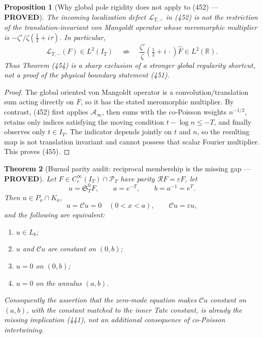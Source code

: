 \documentclass[11pt]{article}
\newtheorem{theorem}{Theorem}
\newtheorem{proposition}[theorem]{Proposition}
\newcommand{\PROVED}{\textcolor{green!45!black}{\textbf{PROVED}}}
\begin{document}
\begin{proposition}[Why global pole rigidity does not apply to (452) ---
\PROVED]
The incoming localization defect \(\mathcal L_{T,-}\) in (452) is not the
restriction of the translation-invariant von Mangoldt operator whose
meromorphic multiplier is
\(-\zeta'/\zeta(\frac12+i\tau)\).  In particular,
\[
 \mathcal L_{T,-}(F)\in L^2(I_T)
 \quad\not\Longleftrightarrow\quad
 \frac{\zeta'}{\zeta}(\tfrac12+i\,\cdot)\widehat F
 \in L^2(\mathbb R).                                 \tag{455}
\]
Thus Theorem (454) is a sharp exclusion of a stronger global regularity
shortcut, not a proof of the physical boundary statement (451).
\end{proposition}

\begin{proof}
The global oriented von Mangoldt operator is a convolution/translation sum
acting directly on \(F\), so it has the stated meromorphic multiplier.
By contrast, (452) first applies \(\mathcal A_\infty\), then sums with the
co-Poisson weights \(n^{-1/2}\), retains only indices satisfying the moving
condition \(t-\log n\le-T\), and finally observes only \(t\in I_T\).
The indicator depends jointly on \(t\) and \(n\), so the resulting map is
not translation invariant and cannot possess that scalar Fourier
multiplier.  This proves (455).
\end{proof}

\begin{theorem}[Burnol parity audit: reciprocal membership is the missing
gap --- \PROVED]
Let \(F\in C_c^\infty(I_T)\cap\mathcal P_T\) have parity
\(\mathcal RF=\varepsilon F\), let
\[
 u=\mathfrak S_T^0F,\qquad a=e^{-T},\qquad b=a^{-1}=e^T.
\]
Then \(u\in P_a\cap K_a\),
\begin{equation}
 u=\mathcal Cu=0\quad(0<x<a),\qquad
 \mathcal Cu=\varepsilon u,                          \tag{456}
\end{equation}
and the following are equivalent:
\begin{enumerate}
\item \(u\in L_b\);
\item \(u\) and \(\mathcal Cu\) are constant on \((0,b)\);
\item \(u=0\) on \((0,b)\);
\item \(u=0\) on the annulus \((a,b)\).
\end{enumerate}
Consequently the assertion that the zero-mode equation makes
\(\mathcal Cu\) constant on \((a,b)\), with the constant matched to the
inner Tate constant, is already the missing implication (441), not an
additional consequence of co-Poisson intertwining.
\end{theorem}
\end{document}
